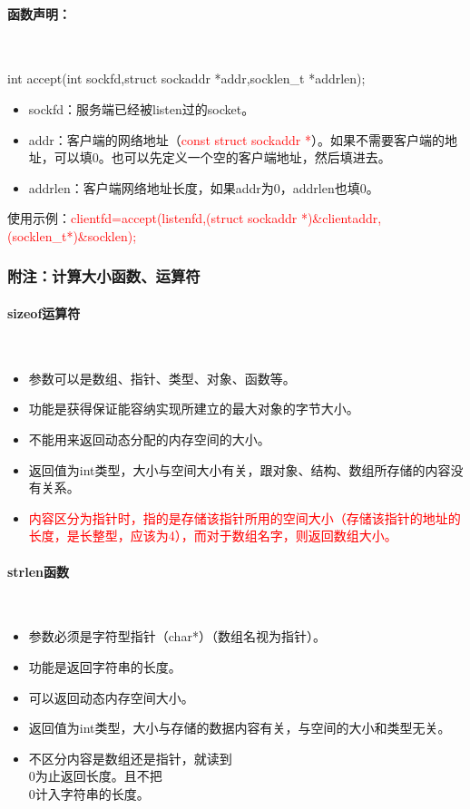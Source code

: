 \documentclass[UTF8]{article}%
\begin{document}
\paragraph{函数声明：}~{}

int accept(int sockfd,struct sockaddr *addr,socklen\_t *addrlen);

\begin{itemize}
    \item sockfd：服务端已经被listen过的socket。
    \item addr：客户端的网络地址（\textcolor{red}{const struct sockaddr *}）。如果不需要客户端的地址，可以填0。也可以先定义一个空的客户端地址，然后填进去。
    \item addrlen：客户端网络地址长度，如果addr为0，addrlen也填0。
\end{itemize}

使用示例：\textcolor{red}{clientfd=accept(listenfd,(struct sockaddr *)\&clientaddr,(socklen\_t*)\&socklen);}





\subsubsection{附注：计算大小函数、运算符}

\paragraph{sizeof运算符}~{}

\begin{itemize}
    \item 参数可以是数组、指针、类型、对象、函数等。
    \item 功能是获得保证能容纳实现所建立的最大对象的字节大小。
    \item 不能用来返回动态分配的内存空间的大小。
    \item 返回值为int类型，大小与空间大小有关，跟对象、结构、数组所存储的内容没有关系。
    \item \textcolor{red}{内容区分为指针时，指的是存储该指针所用的空间大小（存储该指针的地址的长度，是长整型，应该为4），而对于数组名字，则返回数组大小。}
\end{itemize}

\paragraph{strlen函数}~{}

\begin{itemize}
    \item 参数必须是字符型指针（char*）（数组名视为指针）。
    \item 功能是返回字符串的长度。
    \item 可以返回动态内存空间大小。
    \item 返回值为int类型，大小与存储的数据内容有关，与空间的大小和类型无关。
    \item 不区分内容是数组还是指针，就读到\\0为止返回长度。且不把\\0计入字符串的长度。
\end{itemize}
\end{document}
